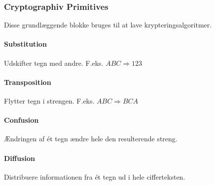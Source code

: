 \subsubsection{Cryptographiv Primitives}
Disse grundlæggende blokke bruges til at lave krypteringsalgoritmer.

\paragraph{Substitution}
Udskifter tegn med andre. F.eks. $ABC \Rightarrow 123$

\paragraph{Transposition}
Flytter tegn i strengen. F.eks. $ABC \Rightarrow BCA$

\paragraph{Confusion}
Ændringen af ét tegn ændre hele den resulterende streng.

\paragraph{Diffusion}
Distribuere informationen fra ét tegn ud i hele cifferteksten.